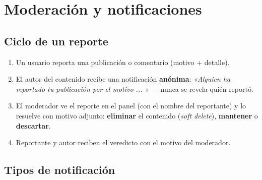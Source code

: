 \documentclass{article}
\begin{document}
\section{Moderación y notificaciones}

\subsection{Ciclo de un reporte}
\begin{enumerate}[itemsep=1pt]
    \item Un usuario reporta una publicación o comentario (motivo + detalle).
    \item El autor del contenido recibe una notificación \textbf{anónima}:
    \textit{«Alguien ha reportado tu publicación por el motivo ... »} — nunca
    se revela quién reportó.
    \item El moderador ve el reporte en el panel (con el nombre del
    reportante) y lo resuelve con motivo adjunto: \textbf{eliminar} el
    contenido (\textit{soft delete}), \textbf{mantener} o \textbf{descartar}.
    \item Reportante y autor reciben el veredicto con el motivo del moderador.
\end{enumerate}

\subsection{Tipos de notificación}
\end{document}
